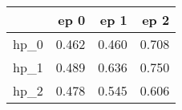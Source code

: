\begin{tabular}{lrrr}
\toprule
{} &   ep 0 &   ep 1 &   ep 2 \\
\midrule
hp\_0 &  0.462 &  0.460 &  0.708 \\
hp\_1 &  0.489 &  0.636 &  0.750 \\
hp\_2 &  0.478 &  0.545 &  0.606 \\
\bottomrule
\end{tabular}
